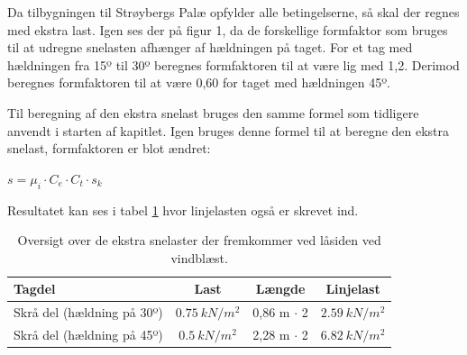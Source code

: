 Da tilbygningen til Strøybergs Palæ opfylder alle betingelserne, så skal der regnes med ekstra last.  Igen ses der på figur 1, da de forskellige formfaktor som bruges til at udregne snelasten afhænger af hældningen på taget. For et tag med hældningen fra 15º til 30º beregnes formfaktoren til at være lig med 1,2. Derimod beregnes formfaktoren til at være 0,60 for taget med hældningen 45º. 

Til beregning af den ekstra snelast bruges den samme formel som tidligere anvendt i starten af kapitlet. Igen bruges denne formel til at beregne den ekstra snelast, formfaktoren er blot ændret:

$s = \mu_i \cdot C_e  \cdot  C_t \cdot s_k$

Resultatet kan ses i tabel \ref{tab:SLT3} hvor linjelasten også er skrevet ind.

\begin{table}[H]
\centering
\begin{tabular}{|l|c|c|c|}
\hline
\textbf{Tagdel}            & \textbf{Last} & \textbf{Længde} & \textbf{Linjelast} \\ \hline
Skrå del (hældning på 30º) & $\SI{0,75}{kN/m^2}$                      & 0,86 m $\cdot$ 2              & $\SI{2,59}{kN/m^2}$                                                                                                               \\ \hline
Skrå del (hældning på 45º) & $\SI{0,5}{kN/m^2}$                                     & 2,28 m $\cdot$ 2               & $\SI{6,82}{kN/m^2}$                                                                                                              \\ \hline
\end{tabular}
\caption{Oversigt over de ekstra snelaster der fremkommer ved låsiden ved vindblæst.}
\label{tab:SLT3}
\end{table}

